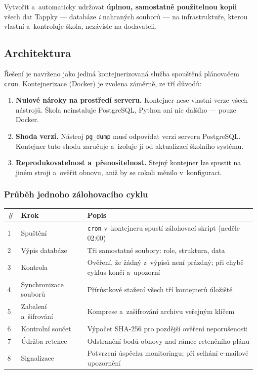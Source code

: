 \documentclass[11pt,a4paper]{article}
\begin{document}
Vytvořit a~automaticky udržovat \textbf{úplnou, samostatně použitelnou kopii} všech dat Tappky
--- databáze \emph{i} nahraných souborů --- na infrastruktuře, kterou vlastní a~kontroluje škola,
nezávisle na dodavateli.

\subsection{Architektura}

Řešení je navrženo jako jediná kontejnerizovaná služba spouštěná plánovačem \texttt{cron}.
Kontejnerizace (Docker) je zvolena záměrně, ze tří důvodů:

\begin{enumerate}[leftmargin=1.6em]
  \item \textbf{Nulové nároky na prostředí serveru.} Kontejner nese vlastní verze všech nástrojů.
        Škola neinstaluje PostgreSQL, Python ani nic dalšího --- pouze Docker.
  \item \textbf{Shoda verzí.} Nástroj \texttt{pg\_dump} musí odpovídat verzi serveru PostgreSQL.
        Kontejner tuto shodu zaručuje a~izoluje ji od aktualizací školního systému.
  \item \textbf{Reprodukovatelnost a~přenositelnost.} Stejný kontejner lze spustit na jiném
        stroji a~ověřit obnovu, aniž by se cokoli měnilo v~konfiguraci.
\end{enumerate}

\subsubsection*{Průběh jednoho zálohovacího cyklu}

\begin{center}
\begin{tabularx}{\textwidth}{@{}p{0.6cm}p{4.0cm}X@{}}
\toprule
\textbf{\#} & \textbf{Krok} & \textbf{Popis} \\
\midrule
1 & Spuštění & \texttt{cron} v~kontejneru spustí zálohovací skript (neděle 02:00) \\
2 & Výpis databáze & Tři samostatné soubory: role, struktura, data \\
3 & Kontrola & Ověření, že žádný z~výpisů není prázdný; při chybě cyklus končí a~upozorní \\
4 & Synchronizace souborů & Přírůstkové stažení všech tří kontejnerů úložiště \\
5 & Zabalení a~šifrování & Komprese a~zašifrování archivu veřejným klíčem \\
6 & Kontrolní součet & Výpočet SHA-256 pro pozdější ověření neporušenosti \\
7 & Údržba retence & Odstranění bodů obnovy nad rámec retenčního plánu \\
8 & Signalizace & Potvrzení úspěchu monitoringu; při selhání e-mailové upozornění \\
\bottomrule
\end{tabularx}
\end{center}
\end{document}
